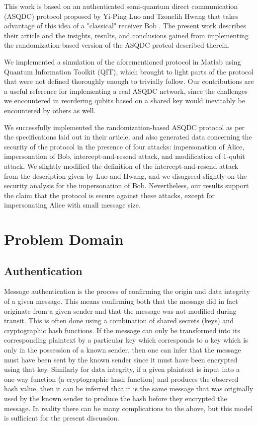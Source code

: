 \documentclass[conference]{IEEEtran}
\begin{document}
This work is based on an authenticated semi-quantum direct communication (ASQDC) protocol
proposed by Yi-Ping Luo and Tzonelih Hwang that takes advantage of this idea
of a "classical" receiver Bob \cite{LuoHwang}.
The present work describes their article and the insights,
results, and conclusions gained from implementing the randomization-based version
of the ASQDC protcol described therein.

We implemented a simulation of the aforementioned protocol in Matlab
using Quantum Information Toolkit (QIT), which brought to light parts of the
protocol that were not defined thoroughly enough to trivially follow.
Our contributions are a useful reference for implementing a real ASQDC
network, since the challenges we encountered in reordering qubits based
on a shared key would inevitably be encountered by others as well.

We successfully implemented the randomization-based ASQDC
protocol as per the specifications laid out in their article,
and also generated data concerning the security of the protocol
in the presence of four attacks: impersonation of Alice, impersonation
of Bob, intercept-and-resend attack, and modification of 1-qubit attack.
We slightly modified the definition of the intercept-and-resend attack
from the description given by Luo and Hwang, and we disagreed slightly on the
security analysis for the impersonation of Bob. Nevertheless, our
results support the claim that the protocol is secure against these
attacks, except for impersonating Alice with small message size.

\section{Problem Domain}

\subsection{Authentication}

Message authentication is the process of confirming the origin and
data integrity of a given message. This means confirming both that the
message did in fact originate from a given sender and that the message
was not modified during transit. This is often done using a combination of
shared secrets (keys) and cryptographic hash functions. If the message
can only be transformed into its corresponding plaintext by a particular key
which corresponds to a key which is only in the possession
of a known sender, then one can infer that the message must have been
sent by the known sender since it must have been encrypted using that
key. Similarly for data integrity, if a given plaintext is input
into a one-way function (a cryptographic hash function) and produces
the observed hash value, then it can be inferred that it is the same
message that was originally used by the known sender to produce the
hash before they encrypted the message. In reality there
can be many complications to the above, but this model is sufficient
for the present discussion.
\end{document}
